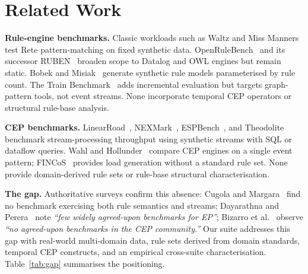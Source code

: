 
\section{Related Work}\label{sec:related}

\textbf{Rule-engine benchmarks.}
Classic workloads such as Waltz and Miss Manners~\cite{brownston1985ops5,forgy1982rete} test Rete pattern-matching on fixed synthetic data.
OpenRuleBench~\cite{liang2009openrulebench} and its successor RUBEN~\cite{angele2022ruben} broaden scope to Datalog and OWL engines but remain static.
Bobek and Misiak~\cite{bobek2017benchmarking} generate synthetic rule models parameterised by rule count.
The Train Benchmark~\cite{szarnyas2018train} adds incremental evaluation but targets graph-pattern tools, not event streams.
None incorporate temporal CEP operators or structural rule-base analysis.

\textbf{CEP benchmarks.}
LinearRoad~\cite{arasu2004linearroad}, NEXMark~\cite{tucker2003nexmark}, ESPBench~\cite{hesse2021espbench}, and Theodolite~\cite{henning2021theodolite} benchmark stream-processing throughput using synthetic streams with SQL or dataflow queries.
Wahl and Hollunder~\cite{wahl2012cep} compare CEP engines on a single event pattern; FINCoS~\cite{mendes2013fincos} provides load generation without a standard rule set.
None provide domain-derived rule sets or rule-base structural characterisation.

\textbf{The gap.}
Authoritative surveys confirm this absence: Cugola and Margara~\cite{cugola2012processing} find no benchmark exercising both rule semantics and streams; Dayarathna and Perera~\cite{dayarathna2018event} note \emph{``few widely agreed-upon benchmarks for EP''}; Bizarro et al.~\cite{bizarro2011bicep} observe \emph{``no agreed-upon benchmarks in the CEP community.''}
Our suite addresses this gap with real-world multi-domain data, rule sets derived from domain standards, temporal CEP constructs, and an empirical cross-suite characterisation.
Table~\ref{tab:gap} summarises the positioning.


